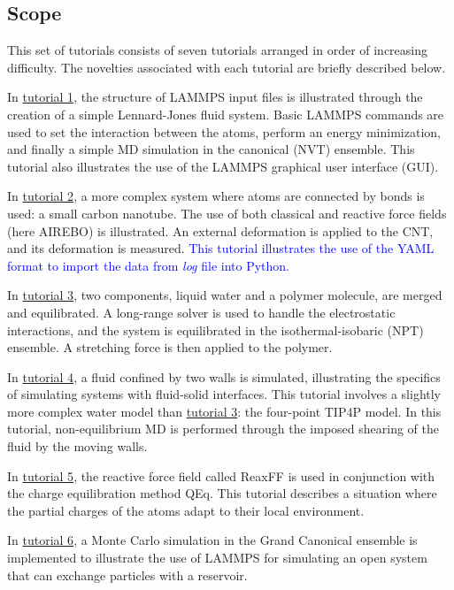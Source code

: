 \documentclass[9pt,tutorial]{livecoms}
\begin{document}
\subsection{Scope}

This set of tutorials consists of seven tutorials arranged in order of increasing difficulty. The novelties associated with each tutorial are briefly described below.

In \hyperref[lennard-jones-label]{tutorial 1}, the structure of LAMMPS input files is illustrated through the creation of a simple Lennard-Jones fluid system. Basic LAMMPS commands are used to set the interaction between the atoms, perform an energy minimization, and finally a simple MD simulation in the canonical (NVT) ensemble. This tutorial also illustrates the use of the LAMMPS graphical user interface (GUI).

In \hyperref[carbon-nanotube-label]{tutorial 2}, a more complex system where atoms are connected by bonds is used: a small carbon nanotube. The use of both classical and reactive force fields (here AIREBO) is illustrated. An external deformation is applied to the CNT, and its deformation is measured. \textcolor{blue}{This tutorial illustrates the use of the YAML format to import the data from \textit{log} file into Python.}

In \hyperref[all-atoms-label]{tutorial 3}, two components, liquid water and a polymer molecule, are merged and equilibrated. A long-range solver is used to handle the electrostatic interactions, and the system is equilibrated in the isothermal-isobaric (NPT) ensemble. A stretching force is then applied to the polymer.

In \hyperref[sheared-confined-label]{tutorial 4}, a fluid confined by two walls is simulated, illustrating the specifics of simulating systems with fluid-solid interfaces. This tutorial involves a slightly more complex water model than \hyperref[all-atoms-label]{tutorial 3}: the four-point TIP4P model. In this tutorial, non-equilibrium MD is performed through the imposed shearing of the fluid by the moving walls.

In \hyperref[reactive-silicon-dioxide-label]{tutorial 5}, the reactive force field called ReaxFF is used in conjunction with the charge equilibration method QEq. This tutorial describes a situation where the partial charges of the atoms adapt to their local environment.

In \hyperref[gcmc-silica-label]{tutorial 6}, a Monte Carlo simulation in the Grand Canonical ensemble is implemented to illustrate the use of LAMMPS for simulating an open system that can exchange particles with a reservoir.
\end{document}
